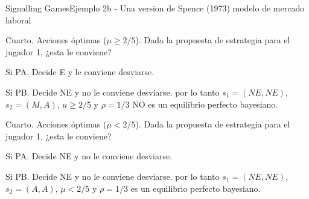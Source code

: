 \documentclass[notes, 11pt]{beamer} %
\newenvironment{wideitemize}{\itemize\addtolength{\itemsep}{10pt}}{\enditemize}
\begin{document}
\begin{frame}{Signalling Games}{Ejemplo 2b - Una version de Spence (1973) modelo de mercado laboral}
	\begin{wideitemize}
		\item<1-> Cuarto. Acciones \'optimas ($\mu \geq 2/5$). Dada la propuesta de estrategia para el jugador 1, ¿esta le conviene?
		\begin{wideitemize}
			\item<1->[--] Si PA. Decide E y le conviene desviarse.
			\item<1->[--] Si PB. Decide NE y no le conviene desviarse.
		\end{wideitemize} por lo tanto $s_{1} = (NE,NE)$, $s_{2} = (M,A)$, $u\geq 2/5$ y $\rho=1/3$ NO es un equilibrio perfecto bayesiano.
		\item<2-> Cuarto. Acciones \'optimas ($\mu < 2/5$). Dada la propuesta de estrategia para el jugador 1, ¿esta le conviene?
		\begin{wideitemize}
			\item<2->[--] Si PA. Decide NE y no le conviene desviarse.
			\item<2->[--] Si PB. Decide NE y no le conviene desviarse.
		\end{wideitemize} por lo tanto $s_{1} = (NE,NE)$, $s_{2} = (A,A)$, $\mu < 2/5$ y $\rho=1/3$ es un equilibrio perfecto bayesiano.
	\end{wideitemize}
\end{frame}
\end{document}
